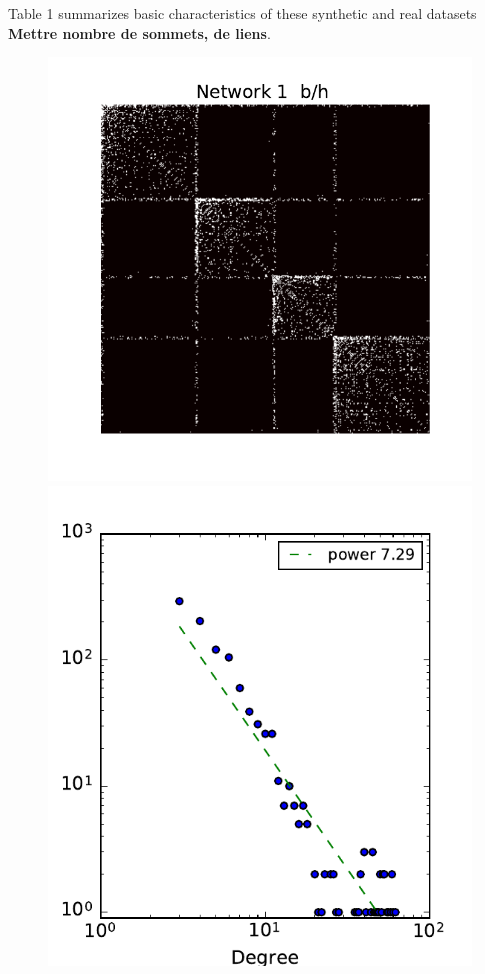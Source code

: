 Table 1 summarizes basic characteristics of these synthetic and real datasets \textbf{ Mettre nombre de sommets, de liens}.


\begin{figure}[h]
	\centering
	
	\includegraphics[scale=0.4]{img/g1}
	\endminipage
	\includegraphics[scale=0.4]{img/g1_d}

\end{figure}
